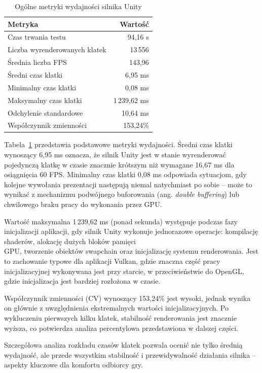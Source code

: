 \begin{table}[H]
\centering
\caption{Ogólne metryki wydajności silnika Unity}
\label{tab:unity-performance-summary}
\begin{tabular}{|l|r|}
\hline
\textbf{Metryka} & \textbf{Wartość} \\
\hline
Czas trwania testu & 94,16 s \\
Liczba wyrenderowanych klatek & 13\,556 \\
Średnia liczba FPS & 143,96 \\
Średni czas klatki & 6,95 ms \\
Minimalny czas klatki & 0,08 ms \\
Maksymalny czas klatki & 1\,239,62 ms \\
Odchylenie standardowe & 10,64 ms \\
Współczynnik zmienności & 153,24\% \\
\hline
\end{tabular}
\end{table}

Tabela~\ref{tab:unity-performance-summary} przedstawia podstawowe metryki wydajności. Średni czas 
klatki wynoszący 6,95 ms oznacza, że silnik 
Unity jest w stanie wyrenderować pojedynczą klatkę w czasie znacznie krótszym niż wymagane 16,67 ms 
dla osiągnięcia 60 FPS. Minimalny czas 
klatki 0,08 ms odpowiada sytuacjom, gdy kolejne wywołania prezentacji następują niemal natychmiast po 
sobie -- może to wynikać z mechanizmu 
podwójnego buforowania (ang. \textit{double buffering}) lub chwilowego braku pracy do wykonania przez GPU.

Wartość maksymalna 1\,239,62 ms (ponad sekunda) występuje podczas fazy inicjalizacji aplikacji, 
gdy silnik Unity wykonuje jednorazowe operacje: kompilację shaderów, alokację dużych bloków pamięci \\ GPU, 
tworzenie obiektów swapchain oraz 
inicjalizację systemu renderowania. Jest to zachowanie typowe dla aplikacji Vulkan, gdzie znaczna część 
pracy inicjalizacyjnej wykonywana jest przy 
starcie, w przeciwieństwie do OpenGL, gdzie inicjalizacja jest bardziej rozłożona w czasie.

Współczynnik zmienności (CV) wynoszący 153,24\% jest wysoki, jednak wynika on głównie z 
uwzględnienia ekstremalnych wartości inicjalizacyjnych. 
Po wykluczeniu pierwszych kilku klatek, stabilność renderowania jest znacznie wyższa, co potwierdza 
analiza percentylowa przedstawiona w dalszej części.


Szczegółowa analiza rozkładu czasów klatek pozwala ocenić nie tylko średnią wydajność, ale przede 
wszystkim stabilność i przewidywalność działania 
silnika -- aspekty kluczowe dla komfortu odbiorcy gry.

